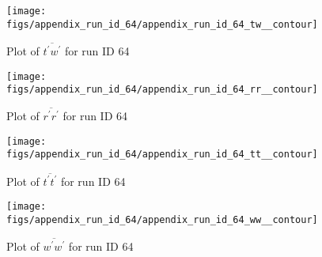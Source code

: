 \begin{figure}[H]
\centering
\texttt{[image: figs/appendix\_run\_id\_64/appendix\_run\_id\_64\_tw\_\_contour]}
\caption{Plot of $\overline{t^\prime w^\prime}$ for run ID 64}
\label{fig:appendix_run_id_64_tw__contour}
\end{figure}


\begin{figure}[H]
\centering
\texttt{[image: figs/appendix\_run\_id\_64/appendix\_run\_id\_64\_rr\_\_contour]}
\caption{Plot of $\overline{r^\prime r^\prime}$ for run ID 64}
\label{fig:appendix_run_id_64_rr__contour}
\end{figure}


\begin{figure}[H]
\centering
\texttt{[image: figs/appendix\_run\_id\_64/appendix\_run\_id\_64\_tt\_\_contour]}
\caption{Plot of $\overline{t^\prime t^\prime}$ for run ID 64}
\label{fig:appendix_run_id_64_tt__contour}
\end{figure}


\begin{figure}[H]
\centering
\texttt{[image: figs/appendix\_run\_id\_64/appendix\_run\_id\_64\_ww\_\_contour]}
\caption{Plot of $\overline{w^\prime w^\prime}$ for run ID 64}
\label{fig:appendix_run_id_64_ww__contour}
\end{figure}


